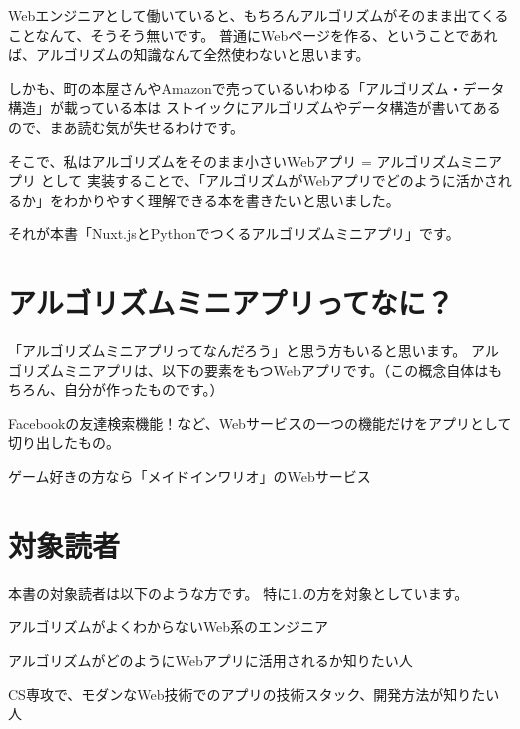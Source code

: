 Webエンジニアとして働いていると、もちろんアルゴリズムがそのまま出てくることなんて、そうそう無いです。
普通にWebページを作る、ということであれば、アルゴリズムの知識なんて全然使わないと思います。

しかも、町の本屋さんやAmazonで売っているいわゆる「アルゴリズム・データ構造」が載っている本は
ストイックにアルゴリズムやデータ構造が書いてあるので、まあ読む気が失せるわけです。

そこで、私はアルゴリズムをそのまま小さいWebアプリ = アルゴリズムミニアプリ として
実装することで、「アルゴリズムがWebアプリでどのように活かされるか」をわかりやすく理解できる本を書きたいと思いました。

それが本書「Nuxt.jsとPythonでつくるアルゴリズムミニアプリ」です。

\section*{アルゴリズムミニアプリってなに？}
\label{sec:-4}

「アルゴリズムミニアプリってなんだろう」と思う方もいると思います。
アルゴリズムミニアプリは、以下の要素をもつWebアプリです。（この概念自体はもちろん、自分が作ったものです。）

\begin{starteritemize}
\item Facebookの友達検索機能！など、Webサービスの一つの機能だけをアプリとして切り出したもの。
\item ゲーム好きの方なら「メイドインワリオ」のWebサービス 
\end{starteritemize}

\section*{対象読者}
\label{sec:-5}

本書の対象読者は以下のような方です。
特に1.の方を対象としています。

\begin{starterenumerate}
\item アルゴリズムがよくわからないWeb系のエンジニア
\item アルゴリズムがどのようにWebアプリに活用されるか知りたい人
\item CS専攻で、モダンなWeb技術でのアプリの技術スタック、開発方法が知りたい人
\end{starterenumerate}

